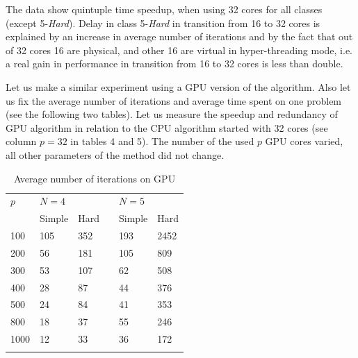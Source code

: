 \documentclass[smallcondensed]{svjour3}     %
\begin{document}
The data show quintuple time speedup, when using 32 cores for all classes (except 5-\textit{Hard}). Delay in class 5-\textit{Hard} in transition from 16 to 32 cores is explained by an increase in average number of iterations and by the fact that out of 32 cores 16 are physical, and other 16 are virtual in hyper-threading mode, i.e. a real gain in performance in transition from 16 to 32 cores is less than double.

Let us make a similar experiment using a GPU version of the algorithm. Also let us fix the average number of iterations and average time spent on one problem (see the following two tables). Let us measure the speedup and redundancy of GPU algorithm in relation to the CPU algorithm started with 32 cores (see column $p=32$ in tables 4 and 5). The number of the used $p$ GPU cores varied, all other parameters of the method did not change.


\begin{table}
	\caption{Average number of iterations on GPU}
	\label{tab:last4}
	\center
	\begin{tabular}{llllll}
		\hline\noalign{\smallskip}
		$p$ & \multicolumn{2}{l}{ $N=4$ } & & \multicolumn{2}{l}{$N=5$} \\
		\noalign{\smallskip} \cline{2-3} \cline{5-6} \noalign{\smallskip}
		 & Simple & Hard & & Simple & Hard  \\
		\noalign{\smallskip} \hline \noalign{\smallskip}		
100 &	105 &	352 & &	193  &	2452 \\
200 &	56 &	181 & &	105  &	809 \\
300 &	53 &	107 & & 62  &	508 \\
400 &	28 &	87 & &	44  &	376 \\
500 &	24 &	84 & &	41  &	353 \\
800 &	18 &	37 & &	55 &	246 \\
1000 &	12 &	33 & &	36 &	172 \\
		\noalign{\smallskip}\hline
	\end{tabular}
\end{table}
\end{document}
